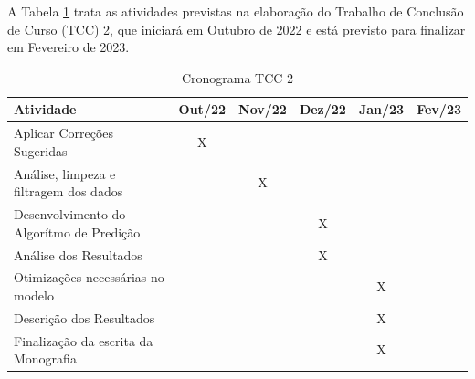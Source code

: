A Tabela \ref{cronograma2} trata as atividades previstas na elaboração do Trabalho de Conclusão de Curso (TCC) 2, que iniciará em Outubro de 2022 e está previsto para finalizar em Fevereiro de 2023.

\begin{table}[H]
\caption{Cronograma TCC 2}
\label{cronograma2}
\begin{tabular}{@{}lccccc@{}}
\toprule
\textbf{Atividade}                       & \multicolumn{1}{l}{\textbf{Out/22}} & \multicolumn{1}{l}{\textbf{Nov/22}} & \multicolumn{1}{l}{\textbf{Dez/22}} & \multicolumn{1}{l}{\textbf{Jan/23}} & \multicolumn{1}{l}{\textbf{Fev/23}} \\ \midrule
Aplicar Correções Sugeridas              & X                                   &                                     &                                     &                                     &                                     \\ \midrule
Análise, limpeza e filtragem dos dados   &                                     & X                                   &                                     &                                     &                                     \\ \midrule
Desenvolvimento do Algorítmo de Predição &                                     &                                     & X                                   &                                     &                                     \\ \midrule
Análise dos Resultados                   &                                     &                                     & X                                   &                                     &                                     \\ \midrule
Otimizações necessárias no modelo        &                                     &                                     &                                     & X                                   &                                     \\ \midrule
Descrição dos Resultados                 &                                     &                                     &                                     & X                                   &                                     \\ \midrule
Finalização da escrita da Monografia     &                                     &                                     &                                     & X                                   &                                     \\ \midrule

\end{tabular}
\end{table}
